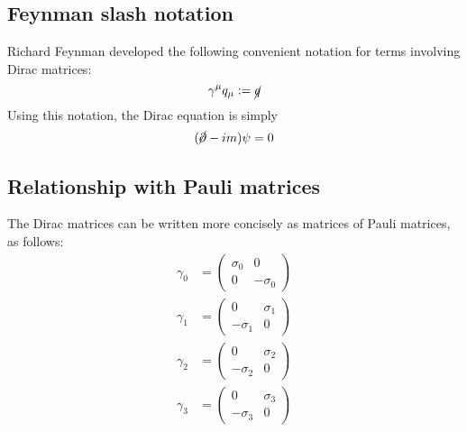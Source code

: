 \documentclass[12pt]{article}
\begin{document}
\subsection{Feynman slash notation}
Richard Feynman developed the following convenient notation for terms involving Dirac matrices:
\[
\gamma^\mu q_\mu := \cancel{q}
\]
Using this notation, the Dirac equation is simply
\[
(\cancel{\partial} - im)\psi = 0
\]
\subsection{Relationship with Pauli matrices}
The Dirac matrices can be written more concisely as matrices of Pauli matrices, as follows:
\begin{align*}
\gamma_0 &= \begin{pmatrix} \sigma_0 & 0\\
                            0 & -\sigma_0
            \end{pmatrix}\\
\gamma_1 &= \begin{pmatrix} 0 & \sigma_1\\
                            -\sigma_1 & 0
            \end{pmatrix}\\
\gamma_2 &= \begin{pmatrix} 0 & \sigma_2\\
                            -\sigma_2 & 0
            \end{pmatrix}\\
\gamma_3 &= \begin{pmatrix} 0 & \sigma_3\\
                            -\sigma_3 & 0
            \end{pmatrix}
\end{align*}
\end{document}
